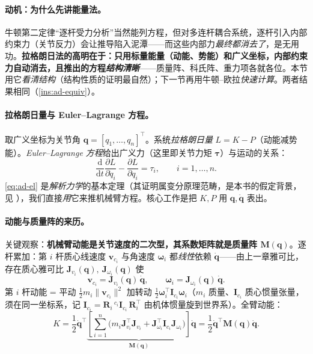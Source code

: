 \paragraph{动机：为什么先讲能量法。}
牛顿第二定律“逐杆受力分析”当然能列方程，但对多连杆耦合系统，逐杆引入内部约束力（关节反力）会让推导陷入泥潭——而这些内部力\emph{最终都消去了}，是无用功。\textbf{拉格朗日法的高明在于：只用标量能量（动能、势能）和广义坐标，内部约束力自动消去，且推出的方程\emph{结构清晰}}——质量阵、科氏阵、重力项各就各位。本节用它\emph{看清结构}（结构性质的证明最自然）；下一节再用牛顿--欧拉\emph{快速计算}。两者结果相同（\cref{ins:ad-equiv}）。

\paragraph{拉格朗日量与 Euler--Lagrange 方程。}
取广义坐标为关节角 $\mathbf{q}=[q_1,\dots,q_n]^\top$。系统\emph{拉格朗日量} $L=K-P$（动能减势能）。\emph{Euler--Lagrange 方程}给出广义力（这里即关节力矩 $\boldsymbol{\tau}$）与运动的关系\cite{spong2006robot,lynch2017modern}：
\begin{equation}
  \boxed{\;\frac{\mathrm{d}}{\mathrm{d}t}\frac{\partial L}{\partial\dot{q}_i}-\frac{\partial L}{\partial q_i}=\tau_i,\qquad i=1,\dots,n.\;}
  \label{eq:ad-el}
\end{equation}
\cref{eq:ad-el} 是\emph{解析力学}的基本定理（其证明属变分原理范畴，是本书的假定背景，见 \cite{tedrake_underactuated}），我们直接\emph{用}它来推机械臂方程。核心工作是把 $K,P$ 用 $\mathbf{q},\dot{\mathbf{q}}$ 表出。

\paragraph{动能与质量阵的来历。}
关键观察：\textbf{机械臂动能是关节速度的二次型，其系数矩阵就是质量阵 $\mathbf{M}(\mathbf{q})$}。逐杆累加：第 $i$ 杆质心线速度 $\mathbf{v}_{c_i}$ 与角速度 $\boldsymbol{\omega}_i$ 都\emph{线性}依赖 $\dot{\mathbf{q}}$——由上一章雅可比，存在质心雅可比 $\mathbf{J}_{v_i}(\mathbf{q}),\ \mathbf{J}_{\omega_i}(\mathbf{q})$ 使
\begin{equation}
  \mathbf{v}_{c_i}=\mathbf{J}_{v_i}(\mathbf{q})\,\dot{\mathbf{q}},\qquad \boldsymbol{\omega}_i=\mathbf{J}_{\omega_i}(\mathbf{q})\,\dot{\mathbf{q}}.
  \label{eq:ad-link-vel}
\end{equation}
第 $i$ 杆动能 = 平动 $\tfrac12 m_i\|\mathbf{v}_{c_i}\|^2$ 加转动 $\tfrac12\boldsymbol{\omega}_i^\top\mathbf{I}_{c_i}\boldsymbol{\omega}_i$（$m_i$ 质量、$\mathbf{I}_{c_i}$ 质心惯量张量，须在同一坐标系，记 $\mathbf{I}_{c_i}=\mathbf{R}_i\,{}^{c_i}\!\mathbf{I}_{c_i}\,\mathbf{R}_i^\top$ 由机体惯量旋到世界系）。全臂动能：
\begin{equation}
  K=\frac12\dot{\mathbf{q}}^\top\!\underbrace{\left[\sum_{i=1}^n\Big(m_i\mathbf{J}_{v_i}^\top\mathbf{J}_{v_i}+\mathbf{J}_{\omega_i}^\top\mathbf{I}_{c_i}\mathbf{J}_{\omega_i}\Big)\right]}_{\displaystyle\mathbf{M}(\mathbf{q})}\dot{\mathbf{q}}=\frac12\dot{\mathbf{q}}^\top\mathbf{M}(\mathbf{q})\dot{\mathbf{q}}.
  \label{eq:ad-kinetic}
\end{equation}

